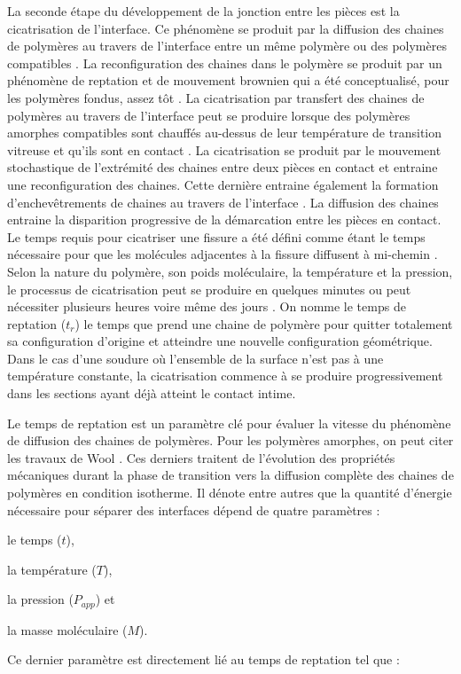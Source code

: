 La seconde étape du développement de la jonction entre les pièces est la cicatrisation de l'interface. 
Ce phénomène se produit par la diffusion des chaines de polymères au travers de l'interface entre un même polymère ou des polymères compatibles \cite{Jud1981b}. 
La reconfiguration des chaines dans le polymère se produit par un phénomène de reptation et de mouvement brownien qui a été conceptualisé, pour les polymères fondus, assez tôt \cite{DeGennes1971,Edwards1978b,Klein1978,Daoud1979}. 
La cicatrisation par transfert des chaines de polymères au travers de l'interface peut se produire lorsque des polymères amorphes compatibles sont chauffés au-dessus de leur température de transition vitreuse et qu'ils sont en contact \cite{Jud1981a,Prager1981a}. 
La cicatrisation se produit par le mouvement stochastique de l'extrémité des chaines entre deux pièces en contact et entraine une reconfiguration des chaines. 
Cette dernière entraine également la formation d'enchevêtrements de chaines au travers de l'interface \cite{Wool1983}. 
La diffusion des chaines entraine la disparition progressive de la démarcation entre les pièces en contact. 
Le temps requis pour cicatriser une fissure a été défini comme étant le temps nécessaire pour que les molécules adjacentes à la fissure diffusent à mi-chemin \cite{Prager1981a}.
Selon la nature du polymère, son poids moléculaire, la température et la pression, le processus de cicatrisation peut se produire en quelques minutes ou peut nécessiter plusieurs heures voire même des jours \cite{Prager1981a}. 
On nomme le temps de reptation ($t_r$) le temps que prend une chaine de polymère pour quitter totalement sa configuration d'origine et atteindre une nouvelle configuration géométrique. 
Dans le cas d'une soudure où l'ensemble de la surface n'est pas à une température constante, la cicatrisation commence à se produire progressivement dans les sections ayant déjà atteint le contact intime. 

Le temps de reptation est un paramètre clé pour évaluer la vitesse du phénomène de diffusion des chaines de polymères. 
Pour les polymères amorphes, on peut citer les travaux de Wool \cite{Wool1983,Wool1989}. 
Ces derniers traitent de l'évolution des propriétés mécaniques durant la phase de transition vers la diffusion complète des chaines de polymères en condition isotherme. 
Il dénote entre autres que la quantité d'énergie nécessaire pour séparer des interfaces dépend de quatre paramètres : \begin{inparaenum}[(1)]
	\item le temps ($t$), 
	\item la température ($T$), 
	\item la pression ($P_{app}$) et
	\item la masse moléculaire ($M$). 
\end{inparaenum}
Ce dernier paramètre est directement lié au temps de reptation tel que \cite{DeGennes1971}: 

